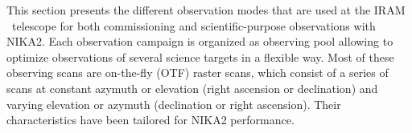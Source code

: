 

This section presents the different observation modes that are used at
the IRAM \trentemetre\ telescope for both commissioning and
scientific-purpose observations with NIKA2. {\lp Each observation
campaign is organized as observing pool allowing to optimize
observations of several science targets in a flexible way.}
Most of these observing scans are on-the-fly (OTF) raster scans,
which consist of a series of scans at constant azymuth or elevation
(right ascension or declination) and varying elevation or azymuth
(declination or right ascension).
Their characteristics have been tailored for NIKA2 performance.



